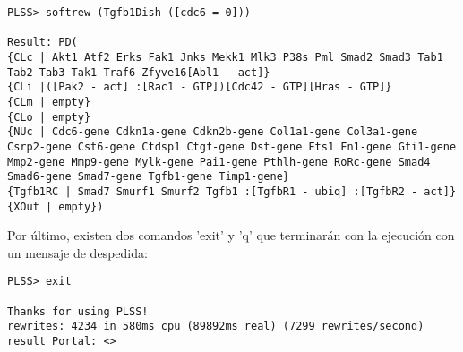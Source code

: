 \begin{lstlisting}[language=Maude]
PLSS> softrew (Tgfb1Dish ([cdc6 = 0]))

Result: PD(
{CLc | Akt1 Atf2 Erks Fak1 Jnks Mekk1 Mlk3 P38s Pml Smad2 Smad3 Tab1 Tab2 Tab3 Tak1 Traf6 Zfyve16[Abl1 - act]}
{CLi |([Pak2 - act] :[Rac1 - GTP])[Cdc42 - GTP][Hras - GTP]}
{CLm | empty}
{CLo | empty}
{NUc | Cdc6-gene Cdkn1a-gene Cdkn2b-gene Col1a1-gene Col3a1-gene Csrp2-gene Cst6-gene Ctdsp1 Ctgf-gene Dst-gene Ets1 Fn1-gene Gfi1-gene Mmp2-gene Mmp9-gene Mylk-gene Pai1-gene Pthlh-gene RoRc-gene Smad4 Smad6-gene Smad7-gene Tgfb1-gene Timp1-gene}
{Tgfb1RC | Smad7 Smurf1 Smurf2 Tgfb1 :[TgfbR1 - ubiq] :[TgfbR2 - act]}
{XOut | empty})
\end{lstlisting}
\smallskip


Por último, existen dos comandos 'exit' y 'q' que terminarán con la ejecución con un mensaje de despedida:
\begin{lstlisting}[language=Maude]
PLSS> exit

Thanks for using PLSS!
rewrites: 4234 in 580ms cpu (89892ms real) (7299 rewrites/second)
result Portal: <>
\end{lstlisting}
\smallskip


